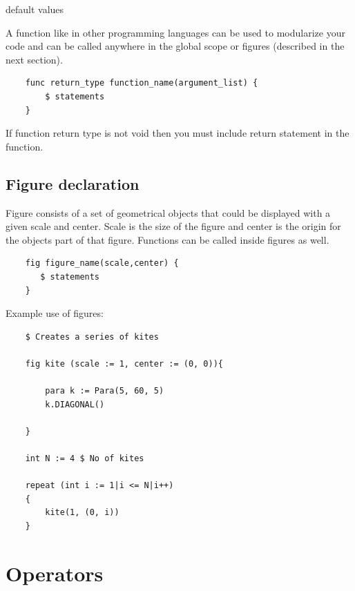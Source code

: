 \documentclass[12pt]{article}
\begin{document}
default values

A function like in other programming languages can be used to modularize your code and can be called anywhere in the global scope or figures (described in the next section).
\begin{verbatim}
    func return_type function_name(argument_list) {
        $ statements
    }
\end{verbatim}
If function return type is not void then you must include return statement in the function.
\subsection{Figure declaration}
Figure consists of a set of geometrical objects that could be displayed with a given scale and center. Scale is the size of the figure and center is the origin for the objects part of that figure. Functions can be called inside figures as well.
\begin{verbatim}
    fig figure_name(scale,center) {
       $ statements
    }
\end{verbatim}
Example use of figures:
\begin{verbatim}
    $ Creates a series of kites
    
    fig kite (scale := 1, center := (0, 0)){

        para k := Para(5, 60, 5)
        k.DIAGONAL()
        
    }

    int N := 4 $ No of kites
    
    repeat (int i := 1|i <= N|i++)
    {
        kite(1, (0, i))
    }
\end{verbatim}


\section{Operators}

\end{document}
